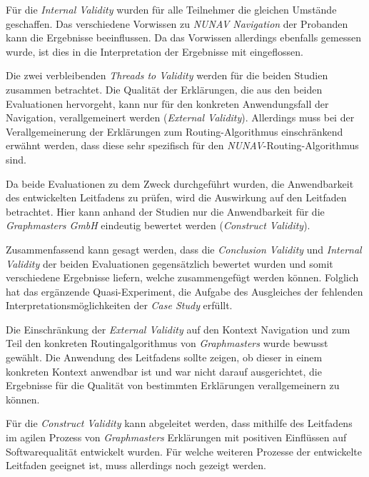 Für die \textit{Internal Validity} wurden für alle Teilnehmer die gleichen Umstände geschaffen. Das verschiedene Vorwissen zu \textit{NUNAV Navigation} der Probanden kann die Ergebnisse beeinflussen. Da das Vorwissen allerdings ebenfalls gemessen wurde, ist dies in die Interpretation der Ergebnisse mit eingeflossen.

\smallskip

Die zwei verbleibenden \textit{Threads to Validity} werden für die beiden Studien zusammen betrachtet. Die Qualität der Erklärungen, die aus den beiden Evaluationen hervorgeht, kann nur für den konkreten Anwendungsfall der Navigation, verallgemeinert werden (\textit{External Validity}). Allerdings muss bei der Verallgemeinerung der Erklärungen zum Routing-Algorithmus einschränkend erwähnt werden, dass diese sehr spezifisch für den \textit{NUNAV}-Routing-Algorithmus sind.

Da beide Evaluationen zu dem Zweck durchgeführt wurden, die Anwendbarkeit des entwickelten Leitfadens zu prüfen, wird die Auswirkung auf den Leitfaden betrachtet. Hier kann anhand der Studien nur die Anwendbarkeit für die \textit{Graphmasters GmbH} eindeutig bewertet werden (\textit{Construct Validity}). 

\smallskip

Zusammenfassend kann gesagt werden, dass die \textit{Conclusion Validity} und \textit{Internal Validity} der beiden Evaluationen gegensätzlich bewertet wurden und somit verschiedene Ergebnisse liefern, welche zusammengefügt werden können. Folglich hat das ergänzende Quasi-Experiment, die Aufgabe des Ausgleiches der fehlenden Interpretationsmöglichkeiten der \textit{Case Study} erfüllt.

Die Einschränkung der \textit{External Validity} auf den Kontext Navigation und zum Teil den konkreten Routingalgorithmus von \textit{Graphmasters} wurde bewusst gewählt. Die Anwendung des Leitfadens sollte zeigen, ob dieser in einem konkreten Kontext anwendbar ist und war nicht darauf ausgerichtet, die Ergebnisse für die Qualität von bestimmten Erklärungen verallgemeinern zu können.

Für die \textit{Construct Validity} kann abgeleitet werden, dass mithilfe des Leitfadens im agilen Prozess von \textit{Graphmasters} Erklärungen mit positiven Einflüssen auf Softwarequalität entwickelt wurden. Für welche weiteren Prozesse der entwickelte Leitfaden geeignet ist, muss allerdings noch gezeigt werden.